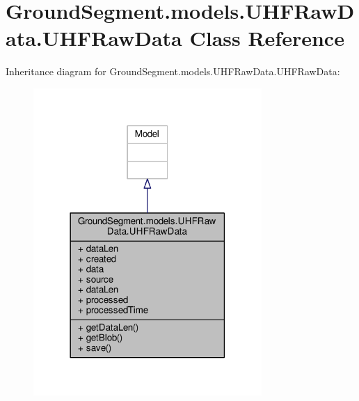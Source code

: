 \hypertarget{class_ground_segment_1_1models_1_1_u_h_f_raw_data_1_1_u_h_f_raw_data}{}\section{Ground\+Segment.\+models.\+U\+H\+F\+Raw\+Data.\+U\+H\+F\+Raw\+Data Class Reference}
\label{class_ground_segment_1_1models_1_1_u_h_f_raw_data_1_1_u_h_f_raw_data}


Inheritance diagram for Ground\+Segment.\+models.\+U\+H\+F\+Raw\+Data.\+U\+H\+F\+Raw\+Data\+:\nopagebreak
\begin{figure}[H]
\begin{center}
\leavevmode
\includegraphics[width=246pt]{class_ground_segment_1_1models_1_1_u_h_f_raw_data_1_1_u_h_f_raw_data__inherit__graph}
\end{center}
\end{figure}


